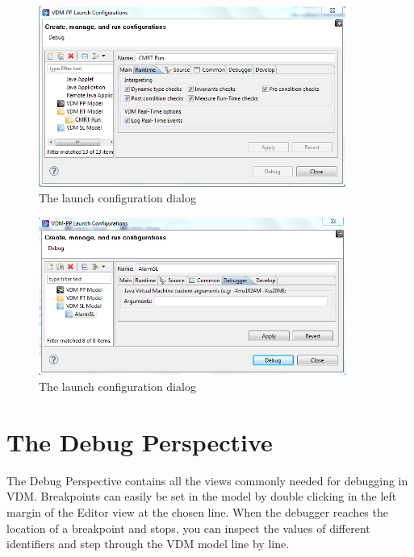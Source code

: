 \documentclass{overturerepchap}
\begin{document}
\begin{figure}[htp]
\begin{center}
  \includegraphics[width=380px]{screenDumps/launchconfigRToptions}
  \caption{The launch configuration dialog}
  \label{fig:userguide:launchconfigRToptions}
\end{center}
\end{figure}

\begin{figure}[htp]
\begin{center}
  \includegraphics[width=380px]{screenDumps/launchconfigSpecialOptions}
  \caption{The launch configuration dialog}
  \label{fig:userguide:launchconfigSpecialOptions}
\end{center}
\end{figure}

\section{The Debug Perspective}

The Debug Perspective contains all the views
commonly needed for debugging in VDM. Breakpoints can easily be set in the
model by double clicking in the left margin of the Editor view at the chosen
line. When the debugger reaches the location of a breakpoint and stops, you can
inspect the values of different identifiers and step through the VDM model 
line by line.
 
\end{document}
